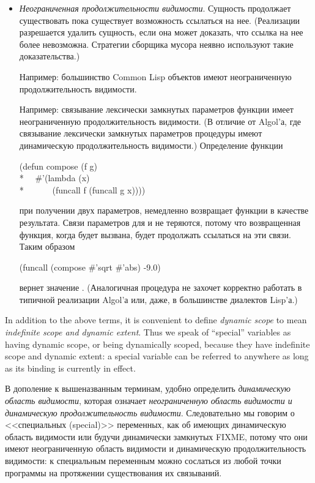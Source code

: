 \begin{itemize}
\item
{\it Неограниченная продолжительности видимости}. Сущность продолжает существовать
пока существует возможность ссылаться на нее. (Реализации разрешается удалить
сущность, если она может доказать, что ссылка на нее более невозможна. Стратегии
сборщика мусора неявно используют такие доказательства.)

Например: большинство Common Lisp объектов имеют неограниченную продолжительность
видимости.

Например: связывание лексически замкнутых параметров функции имеет неограниченную
продолжительность видимости. (В отличие от Algol'а, где связывание лексически
замкнутых параметров процедуры имеют динамическую продолжительность видимости.)
Определение функции
\begin{lisp}
(defun compose (f g) \\*
~~\#'(lambda (x) \\*
~~~~~~(funcall f (funcall g x))))
\end{lisp}
при получении двух параметров, немедленно возвращает функции в качестве
результата.
Связи параметров для  и  не теряются, потому что возвращенная
функция, когда будет вызвана, будет продолжать ссылаться на эти связи.
Таким образом
\begin{lisp}
(funcall (compose \#'sqrt \#'abs) -9.0)
\end{lisp}
вернет значение . (Аналогичная процедура не захочет корректно работать в
типичной реализации Algol'а или, даже, в большинстве диалектов Lisp'а.)
\end{itemize}

In addition to the above terms, it is convenient to define {\it dynamic scope}
to mean {\it indefinite scope and dynamic extent}.  Thus we speak of
``special'' variables as having dynamic scope, or being dynamically scoped,
because they have indefinite scope and dynamic extent: a special variable
can be referred to anywhere as long as its binding is currently
in effect.

В дополение к вышеназванным терминам, удобно определить {\it динамическую
  область видимости}, которая означает {\it неограниченную область видимости и
  динамическую продолжительность видимости}. Следовательно мы говорим о
<<специальных (special)>> переменных, как об имеющих динамическую область
видимости или будучи динамически замкнутых FIXME, потому что они имеют
неограниченную область видимости и динамическую продолжительность видимости:
к специальным переменным можно сослаться из любой точки программы на протяжении
существования их связываний.

